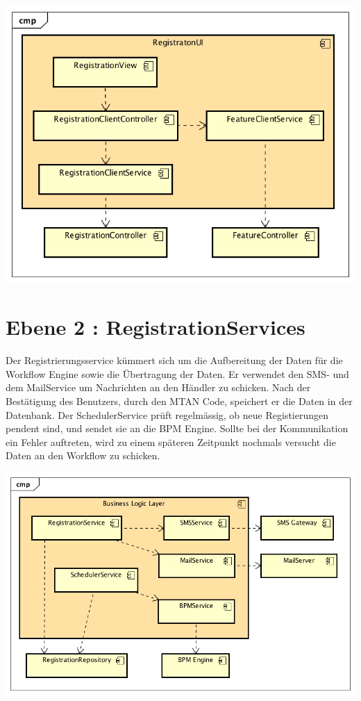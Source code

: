 \begin{center}
	\includegraphics[scale=0.8]{WebComponentLevel2.png}
\end{center}
\newpage
\section{Ebene 2 : RegistrationServices}
\label{reg-service}

Der Registrierungsservice kümmert sich um die Aufbereitung der Daten für die Workflow Engine sowie die Übertragung der Daten. Er verwendet den SMS- und dem MailService um Nachrichten an den Händler zu schicken. Nach der Bestätigung des Benutzers, durch den MTAN Code, speichert er die Daten in der Datenbank. Der SchedulerService prüft regelmässig, ob neue Registierungen pendent sind, und sendet sie an die BPM Engine. Sollte bei der Kommunikation ein Fehler auftreten, wird zu einem späteren Zeitpunkt nochmals versucht die Daten an den Workflow zu schicken. 
\begin{center}
	\includegraphics[scale=0.65]{RegistrationServicesLevel2.png}
\end{center}
\newpage
